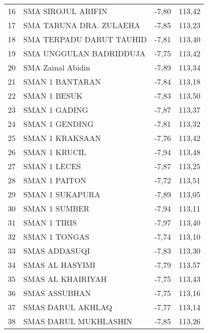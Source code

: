 {\begin{longtable}[c]{clcc}
16 & SMA   SIROJUL ARIFIN                  & -7,80 & 113,42 \\
\rowcolor[HTML]{D9E1F2} 
17 & SMA TARUNA DRA. ZULAEHA               & -7,85 & 113,23 \\
18 & SMA   TERPADU DARUT TAUHID            & -7,81 & 113,40 \\
\rowcolor[HTML]{D9E1F2} 
19 & SMA UNGGULAN BADRIDDUJA               & -7,75 & 113,42 \\
20 & SMA   Zainal Abidin                   & -7,89 & 113,34 \\
\rowcolor[HTML]{D9E1F2} 
21 & SMAN 1 BANTARAN                       & -7,84 & 113,18 \\
22 & SMAN 1   BESUK                        & -7,83 & 113,50 \\
\rowcolor[HTML]{D9E1F2} 
23 & SMAN 1 GADING                         & -7,87 & 113,37 \\
24 & SMAN 1   GENDING                      & -7,81 & 113,32 \\
\rowcolor[HTML]{D9E1F2} 
25 & SMAN 1 KRAKSAAN                       & -7,76 & 113,42 \\
26 & SMAN 1   KRUCIL                       & -7,94 & 113,48 \\
\rowcolor[HTML]{D9E1F2} 
27 & SMAN 1 LECES                          & -7,87 & 113,25 \\
28 & SMAN 1   PAITON                       & -7,72 & 113,51 \\
\rowcolor[HTML]{D9E1F2} 
29 & SMAN 1 SUKAPURA                       & -7,89 & 113,05 \\
30 & SMAN 1   SUMBER                       & -7,94 & 113,11 \\
\rowcolor[HTML]{D9E1F2} 
31 & SMAN 1 TIRIS                          & -7,97 & 113,40 \\
32 & SMAN 1   TONGAS                       & -7,74 & 113,10 \\
\rowcolor[HTML]{D9E1F2} 
33 & SMAS ADDASUQI                         & -7,83 & 113,30 \\
34 & SMAS AL   HASYIMI                     & -7,79 & 113,57 \\
\rowcolor[HTML]{D9E1F2} 
35 & SMAS AL KHAIRIYAH                     & -7,75 & 113,43 \\
36 & SMAS   ASSUBHAN                       & -7,75 & 113,16 \\
\rowcolor[HTML]{D9E1F2} 
37 & SMAS DARUL AKHLAQ                     & -7,77 & 113,14 \\
38 & SMAS   DARUL MUKHLASHIN               & -7,85 & 113,26 \\

\end{longtable}}
